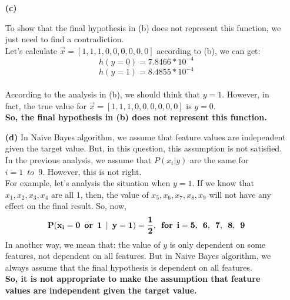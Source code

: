 \begin{enumerate}
\begin{enumerate}
\item[{\bf (c)}]

To show that the final hypothesis in (b) does not represent this function, we just need to find a contradiction.\\

Let's calculate $\vec{x} = [1, 1, 1, 0, 0, 0, 0, 0, 0]$
according to (b), we can get:\\
$$h(y=0) = 7.8466*10^{-4}$$
$$h(y=1) = 8.4855*10^{-4}$$\\

According to the analysis in (b), we should think that $y=1$. However, in fact, the true value for $\vec{x} = [1, 1, 1, 0, 0, 0, 0, 0, 0]$ is $y=0$. \\

{\bf So, the final hypothesis in (b) does not represent this function.}\\

\item[{\bf (d)}]
In Naive Bayes algorithm, we assume that feature values are independent given the target value. But, in this question, this assumption is not satisfied.\\

In the previous analysis, we assume that $P(x_i|y)$ are the same for $i=1 \enspace to \enspace 9$. However, this is not right.\\

For example, let's analysis the situation when $y=1$. If we know that $x_1, x_2, x_3, x_4$ are all 1, then, the value of $x_5, x_6, x_7, x_8, x_9$ will not have any effect on the final result. So, now, 
$${\bf P(x_i=0 \enspace or \enspace 1 \enspace | \enspace y=1)=\frac{1}{2}, \enspace  for  \enspace  i = 5,  \enspace 6, \enspace  7, \enspace  8, \enspace 9}$$
In another way, we mean that: the value of $y$ is only dependent on some features, not dependent on all features. But in Naive Bayes algorithm, we always assume that the final hypothesis is dependent on all features.\\

{\bf So, it is not appropriate to make the assumption that feature values are independent given the target value.}\\


\end{enumerate}


\end{enumerate}
